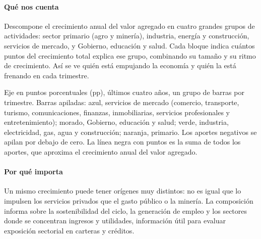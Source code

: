\paragraph{Qué nos cuenta}
Descompone el crecimiento anual del valor agregado en cuatro grandes grupos de actividades: sector primario (agro y minería), industria, energía y construcción, servicios de mercado, y Gobierno, educación y salud. Cada bloque indica cuántos puntos del crecimiento total explica ese grupo, combinando su tamaño y su ritmo de crecimiento. Así se ve quién está empujando la economía y quién la está frenando en cada trimestre.

\begin{leer}
Eje en puntos porcentuales (pp), últimos cuatro años, un grupo de barras por trimestre. Barras apiladas: azul, servicios de mercado (comercio, transporte, turismo, comunicaciones, finanzas, inmobiliarias, servicios profesionales y entretenimiento); morado, Gobierno, educación y salud; verde, industria, electricidad, gas, agua y construcción; naranja, primario. Los aportes negativos se apilan por debajo de cero. La línea negra con puntos es la suma de todos los aportes, que aproxima el crecimiento anual del valor agregado.
\end{leer}

\paragraph{Por qué importa}
Un mismo crecimiento puede tener orígenes muy distintos: no es igual que lo impulsen los servicios privados que el gasto público o la minería. La composición informa sobre la sostenibilidad del ciclo, la generación de empleo y los sectores donde se concentran ingresos y utilidades, información útil para evaluar exposición sectorial en carteras y créditos.


